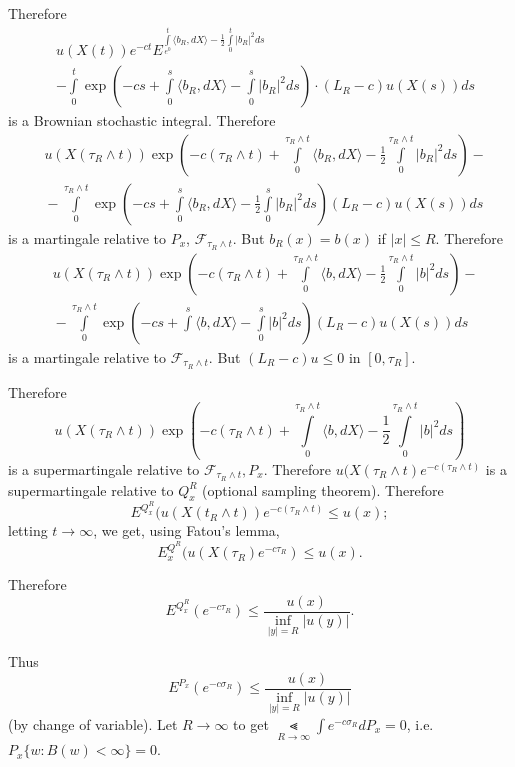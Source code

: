 \begin{claim*}
Therefore
\begin{align*}
& u(X(t))e^{-ct}E^{\int\limits^{t}_{e^{0}}\langle b_{R},dX\rangle
-\frac{1}{2}\int\limits^{t}_{0}|b_{R}|^{2}ds}\\
& -{}\int\limits^{t}_{0}\exp\left(-cs+\int\limits^{s}_{0}\langle
b_{R},dX\rangle -\int\limits^{s}_{0}|b_{R}|^{2}ds\right)\cdot
(L_{R}-c)u(X(s))ds 
\end{align*}
is a Brownian stochastic integral. Therefore
\begin{align*}
& u(X(\tau_{R}\wedge t))\exp \left(-c(\tau_{R}\wedge
  t)+\int\limits^{\tau_{R}\wedge t}_{0}\langle b_{R},dX\rangle
  -\frac{1}{2}\int\limits^{\tau_{R}\wedge t}_{0}|b_{R}|^{2}ds\right)-\\
& {}- \int\limits^{\tau_{R}\wedge t}_{0}\exp
  \left(-cs+\int\limits^{s}_{0}\langle b_{R},dX\rangle
  -\frac{1}{2}\int\limits^{s}_{0}|b_{R}|^{2}ds\right)(L_{R}-c)u(X(s))ds 
\end{align*}
is a martingale relative to $P_{x}$, $\mathscr{F}_{\tau_{R}\wedge
  t}$. But $b_{R}(x)=b(x)$ if $|x|\leq R$. Therefore
\begin{align*}
& u(X(\tau_{R}\wedge t))\exp \left(-c(\tau_{R}\wedge
t)+\int\limits^{\tau_{R}\wedge t}_{0}\langle b,dX\rangle
-\frac{1}{2}\int\limits^{\tau_{R}\wedge t}_{0}|b|^{2}ds\right)-\\
& {}-\int\limits^{\tau_{R}\wedge
  t}_{0}\exp\left(-cs+\int\limits^{s}\langle b,dX\rangle -\int\limits^{s}_{0}|b|^{2}ds\right)(L_{R}-c)u(X(s))ds
\end{align*}
is a martingale relative to $\mathscr{F}_{\tau_{R}\wedge t}$. But
$(L_{R}-c)u\leq 0$ in $[0,\tau_{R}]$. 

Therefore\pageoriginale
$$
u(X(\tau_{R}\wedge t))\exp (-c(\tau_{R}\wedge
t)+\int\limits^{\tau_{R}\wedge t}_{0}\langle b,dX\rangle
-\frac{1}{2}\int\limits^{\tau_{R}\wedge t}_{0}|b|^{2}ds)
$$
is a supermartingale relative to $\mathscr{F}_{\tau_{R}\wedge
  t},P_{x}$. Therefore $u(X(\tau_{R}\wedge t)e^{-c(\tau_{R}\wedge t)}$
is a supermartingale relative to $Q^{R}_{x}$ (optional sampling
theorem). Therefore
$$
E^{Q^{R}_{x}}(u(X(t_{R}\wedge t))e^{-c(\tau_{R}\wedge t)}\leq u(x);
$$
letting $t\to \infty$, we get, using Fatou's lemma,
$$
E^{Q^{R}}_{x}(u(X(\tau_{R})e^{-c\tau_R})\leq u(x).
$$

Therefore
$$
E^{Q^{R}_{x}}(e^{-c\tau_{R}})\leq \frac{u(x)}{\inf\limits_{|y|=R}|u(y)|}.
$$

Thus
$$
E^{P_{x}}(e^{-c\sigma_{R}})\leq \frac{u(x)}{\inf\limits_{|y|=R}|u(y)|}
$$
(by change of variable). Let $R\to \infty$ to get $\Lt\limits_{R\to
  \infty}\int e^{-c\sigma_{R}}dP_{x}=0$, i.e.\@
$P_{x}\{w:B(w)<\infty\}=0$. 
\end{claim*}

